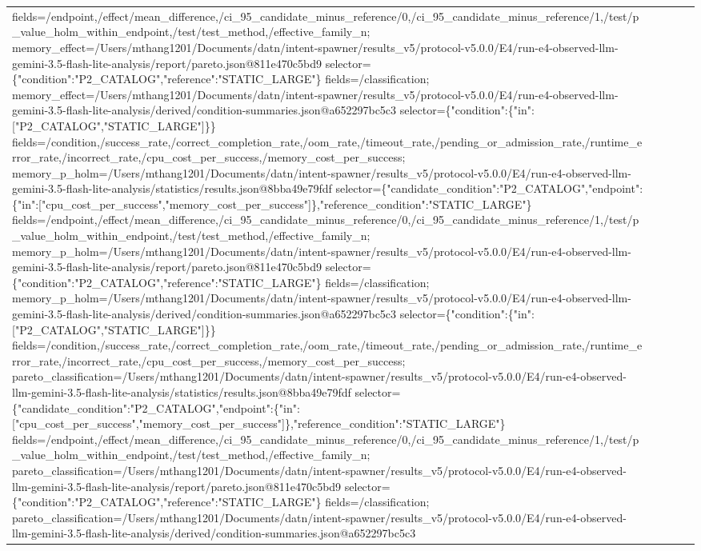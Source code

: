 \begin{tabular}{lllll}
fields=/endpoint,/effect/mean\_difference,/ci\_95\_candidate\_minus\_reference/0,/ci\_95\_candidate\_minus\_reference/1,/test/p\_value\_holm\_within\_endpoint,/test/test\_method,/effective\_family\_n; memory\_effect=/Users/mthang1201/Documents/datn/intent-spawner/results\_v5/protocol-v5.0.0/E4/run-e4-observed-llm-gemini-3.5-flash-lite-analysis/report/pareto.json@811e470c5bd9 selector=\{"condition":"P2\_CATALOG","reference":"STATIC\_LARGE"\} fields=/classification; memory\_effect=/Users/mthang1201/Documents/datn/intent-spawner/results\_v5/protocol-v5.0.0/E4/run-e4-observed-llm-gemini-3.5-flash-lite-analysis/derived/condition-summaries.json@a652297bc5c3 selector=\{"condition":\{"in":["P2\_CATALOG","STATIC\_LARGE"]\}\} fields=/condition,/success\_rate,/correct\_completion\_rate,/oom\_rate,/timeout\_rate,/pending\_or\_admission\_rate,/runtime\_error\_rate,/incorrect\_rate,/cpu\_cost\_per\_success,/memory\_cost\_per\_success; memory\_p\_holm=/Users/mthang1201/Documents/datn/intent-spawner/results\_v5/protocol-v5.0.0/E4/run-e4-observed-llm-gemini-3.5-flash-lite-analysis/statistics/results.json@8bba49e79fdf selector=\{"candidate\_condition":"P2\_CATALOG","endpoint":\{"in":["cpu\_cost\_per\_success","memory\_cost\_per\_success"]\},"reference\_condition":"STATIC\_LARGE"\} fields=/endpoint,/effect/mean\_difference,/ci\_95\_candidate\_minus\_reference/0,/ci\_95\_candidate\_minus\_reference/1,/test/p\_value\_holm\_within\_endpoint,/test/test\_method,/effective\_family\_n; memory\_p\_holm=/Users/mthang1201/Documents/datn/intent-spawner/results\_v5/protocol-v5.0.0/E4/run-e4-observed-llm-gemini-3.5-flash-lite-analysis/report/pareto.json@811e470c5bd9 selector=\{"condition":"P2\_CATALOG","reference":"STATIC\_LARGE"\} fields=/classification; memory\_p\_holm=/Users/mthang1201/Documents/datn/intent-spawner/results\_v5/protocol-v5.0.0/E4/run-e4-observed-llm-gemini-3.5-flash-lite-analysis/derived/condition-summaries.json@a652297bc5c3 selector=\{"condition":\{"in":["P2\_CATALOG","STATIC\_LARGE"]\}\} fields=/condition,/success\_rate,/correct\_completion\_rate,/oom\_rate,/timeout\_rate,/pending\_or\_admission\_rate,/runtime\_error\_rate,/incorrect\_rate,/cpu\_cost\_per\_success,/memory\_cost\_per\_success; pareto\_classification=/Users/mthang1201/Documents/datn/intent-spawner/results\_v5/protocol-v5.0.0/E4/run-e4-observed-llm-gemini-3.5-flash-lite-analysis/statistics/results.json@8bba49e79fdf selector=\{"candidate\_condition":"P2\_CATALOG","endpoint":\{"in":["cpu\_cost\_per\_success","memory\_cost\_per\_success"]\},"reference\_condition":"STATIC\_LARGE"\} fields=/endpoint,/effect/mean\_difference,/ci\_95\_candidate\_minus\_reference/0,/ci\_95\_candidate\_minus\_reference/1,/test/p\_value\_holm\_within\_endpoint,/test/test\_method,/effective\_family\_n; pareto\_classification=/Users/mthang1201/Documents/datn/intent-spawner/results\_v5/protocol-v5.0.0/E4/run-e4-observed-llm-gemini-3.5-flash-lite-analysis/report/pareto.json@811e470c5bd9 selector=\{"condition":"P2\_CATALOG","reference":"STATIC\_LARGE"\} fields=/classification; pareto\_classification=/Users/mthang1201/Documents/datn/intent-spawner/results\_v5/protocol-v5.0.0/E4/run-e4-observed-llm-gemini-3.5-flash-lite-analysis/derived/condition-summaries.json@a652297bc5c3 
\end{tabular}
